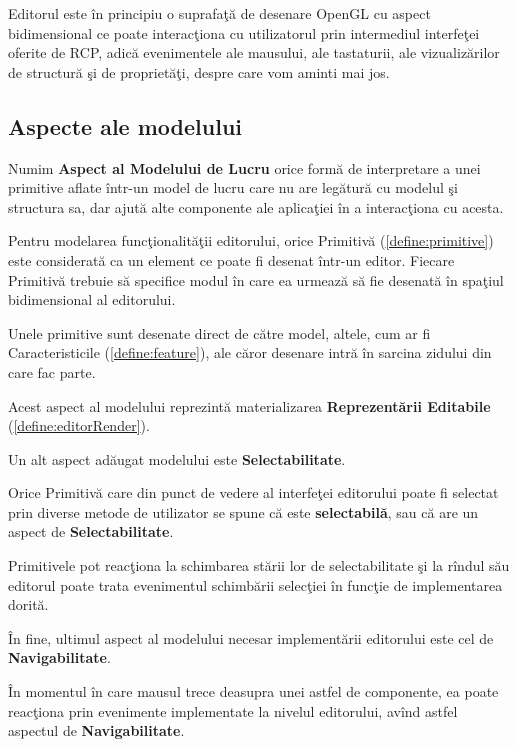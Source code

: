 Editorul este în principiu o suprafaţă de desenare OpenGL cu aspect 
bidimensional ce poate interacţiona cu utilizatorul prin intermediul interfeţei 
oferite de RCP, adică evenimentele ale mausului, ale tastaturii, ale 
vizualizărilor de structură şi de proprietăţi, despre care vom aminti mai jos.

\subsection{Aspecte ale modelului}

\begin{definition}
\label{define:model-aspect}
Numim \textbf{Aspect al Modelului de Lucru} orice formă de interpretare a unei 
primitive aflate într-un model de lucru care nu are legătură cu modelul şi 
structura sa, dar ajută alte componente ale aplicaţiei în a interacţiona cu 
acesta.
\end{definition}

Pentru modelarea funcţionalităţii editorului, orice Primitivă 
(\ref{define:primitive}) este considerată ca un element ce poate fi desenat 
într-un editor. Fiecare Primitivă trebuie să specifice modul în care ea urmează 
să fie desenată în spaţiul bidimensional al editorului.

Unele primitive sunt desenate direct de către model, altele, cum ar fi 
Caracteristicile (\ref{define:feature}), ale căror desenare intră în 
sarcina zidului din care fac parte.

Acest aspect al modelului reprezintă materializarea \textbf{Reprezentării 
Editabile} (\ref{define:editorRender}).

Un alt aspect adăugat modelului este \textbf{Selectabilitate}.

\begin{definition}
\label{define:selectable}
Orice Primitivă care din punct de vedere al interfeţei editorului poate fi 
selectat prin diverse metode de utilizator se spune că este 
\textbf{selectabilă}, sau că are un aspect de \textbf{Selectabilitate}.
\end{definition}

Primitivele pot reacţiona la schimbarea stării lor de selectabilitate şi la 
rîndul său editorul poate trata evenimentul schimbării selecţiei în funcţie de 
implementarea dorită.

În fine, ultimul aspect al modelului necesar implementării editorului este cel 
de \textbf{Navigabilitate}.

\begin{definition}
\label{define:hoverable}
În momentul în care mausul trece deasupra unei 
astfel de componente, ea poate reacţiona prin evenimente implementate la 
nivelul editorului, avînd astfel aspectul de \textbf{Navigabilitate}.
\end{definition}

